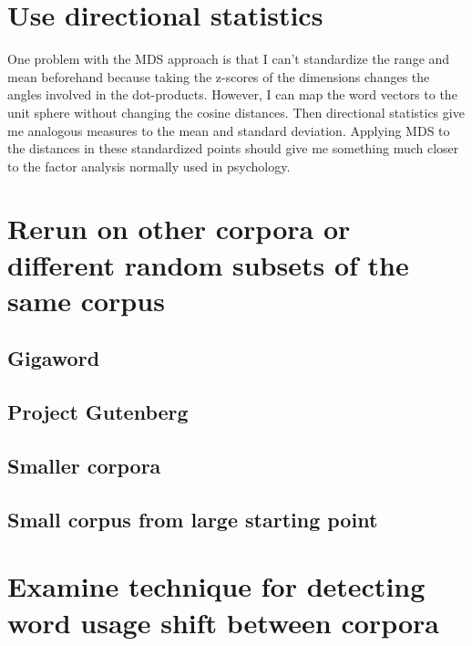 \documentclass[eric_thesis.tex]{subfiles}
\begin{document}
\section{Use directional statistics}


One problem with the MDS approach is that I can't standardize the range and 
mean beforehand because taking the z-scores of the dimensions changes the 
angles involved in the dot-products. However, I can map the word vectors to 
the unit sphere without changing the cosine distances. Then directional 
statistics give me analogous measures to the mean and standard deviation. 
Applying MDS to the distances in these standardized points should give me 
something much closer to the factor analysis normally used in psychology.


\section{Rerun on other corpora or different random subsets of the same corpus}


\subsection{Gigaword}
\subsection{Project Gutenberg}
\subsection{Smaller corpora}
\subsection{Small corpus from large starting point}

\section{Examine technique for detecting word usage shift between corpora}
\end{document}
